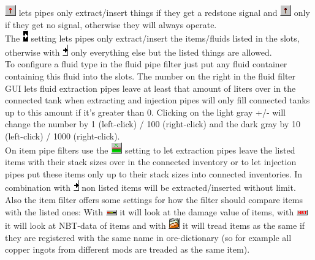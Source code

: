\documentclass[11pt]{article} %
\begin{document}
\includegraphics[align = c]{redstoneOn} lets pipes only extract/insert things if they get a redstone signal and \includegraphics[align = c]{redstoneOff} only if they get no signal, otherwise they will always operate. \\
The \includegraphics[align = c]{allowFilterY} setting lets pipes only extract/insert the items/fluids listed in the slots, otherwise with \includegraphics[align = c]{allowFilterN} only everything else but the listed things are allowed. \\
To configure a fluid type in the fluid pipe filter just put any fluid container containing this fluid into the slots. The number on the right in the fluid filter GUI lets fluid extraction pipes leave at least that amount of liters over in the connected tank when extracting and injection pipes will only fill connected tanks up to this amount if it's greater than 0. Clicking on the light gray +/- will change the number by 1 (left-click) / 100 (right-click) and the dark gray by 10 (left-click) / 1000 (right-click). \\
On item pipe filters use the \includegraphics[align = c]{itemLimitY} setting to let extraction pipes leave the listed items with their stack sizes over in the connected inventory or to let injection pipes put these items only up to their stack sizes into connected inventories. In combination with \includegraphics[align = c]{allowFilterN} non listed items will be extracted/inserted without limit.
Also the item filter offers some settings for how the filter should compare items with the listed ones: With \includegraphics[align = c]{useDamageY} it will look at the damage value of items, with \includegraphics[align = c]{useNBTY} it will look at NBT-data of items and with \includegraphics[align = c]{useOreDict} it will tread items as the same if they are registered with the same name in ore-dictionary (so for example all copper ingots from different mods are treaded as the same item).
\end{document}
